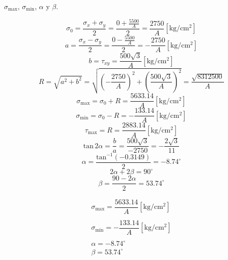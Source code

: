 \documentclass[letter,10pt,twoside]{article}
\begin{document}
$\sigma_{\text{max}}$, $\sigma_{\text{min}}$, $\alpha$ y $\beta$.

\begin{equation*}
    \sigma_0 = \frac{\sigma_x + \sigma_y}{2}
             = \frac{0 + \frac{5500}{A}}{2}
             = \frac{2750}{A}[\text{kg}/\text{cm}^2]
\end{equation*}
\begin{equation*}
    a = \frac{\sigma_x - \sigma_y}{2}
      = \frac{0 - \frac{5500}{A}}{2}
      = - \frac{2750}{A}[\text{kg}/\text{cm}^2]
\end{equation*}
\begin{equation*}
    b = \tau_{xy}
      = \frac{500\sqrt{3}}{A}[\text{kg}/\text{cm}^2]
\end{equation*}
\begin{equation*}
    R = \sqrt{a^2 + b^2}
      = \sqrt{\left(-\frac{2750}{A}\right)^2
        + \left(\frac{500\sqrt{3}}{A}\right)^2}
      = \frac{\sqrt{8312500}}{A}
\end{equation*}
\begin{equation*}
    \sigma_{\text{max}} = \sigma_0 + R
                        = \frac{5633.14}{A}[\text{kg}/\text{cm}^2]
\end{equation*}
\begin{equation*}
    \sigma_{\text{min}} = \sigma_0 - R
                        = -\frac{133.14}{A}[\text{kg}/\text{cm}^2]
\end{equation*}
\begin{equation*}
    \tau_{\text{max}} = R
                      = \frac{2883.14}{A}[\text{kg}/\text{cm}^2]
\end{equation*}
\begin{equation*}
    \text{tan}\,2\alpha = \frac{b}{a}
                        = \frac{500\sqrt{3}}{-2750}
                        = -\frac{2\sqrt{3}}{11}
\end{equation*}
\begin{equation*}
    \alpha = \frac{\text{tan}^{-1}(-0.3149)}{2}
           = -8.74^\circ
\end{equation*}
\begin{equation*}
    2\alpha + 2\beta = 90^\circ
\end{equation*}
\begin{equation*}
    \beta = \frac{90 - 2\alpha}{2}
          = 53.74^\circ
\end{equation*}

\begin{equation*}
\boxed{
    \begin{array}{l}
        \sigma_{\text{max}} = \dfrac{5633.14}{A}[\text{kg}/\text{cm}^2] \\
        \\
        \sigma_{\text{min}} = -\dfrac{133.14}{A}[\text{kg}/\text{cm}^2] \\
        \\
        \alpha = -8.74^\circ \\
        \beta = 53.74^\circ
    \end{array}
}
\end{equation*}
\end{document}
